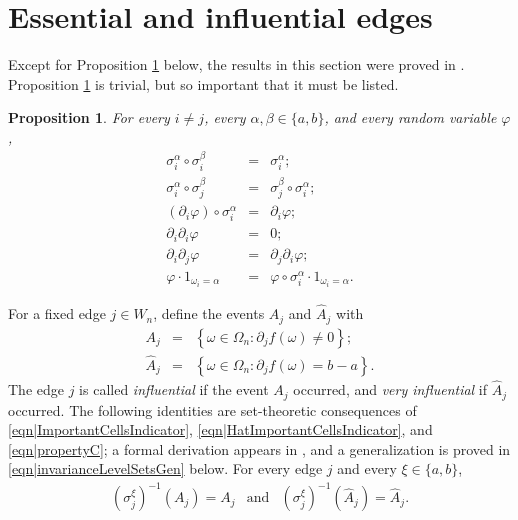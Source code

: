 \documentclass[reqno]{amsart}
\newtheorem{proposition}[theorem]{Proposition}
\begin{document}
\section{Essential and influential edges}
Except for Proposition \ref{thm|Straightforward} below, the results in this section were proved in \cite{FirstPaper2025}. Proposition \ref{thm|Straightforward} is trivial, 
but so important that it must be listed. 
\begin{proposition}\label{thm|Straightforward} For every $i\neq j$, every $\alpha,\beta\in\{a,b\}$, and every random variable $\varphi$, 
\begin{eqnarray} 
\sigma_i^{\alpha}\circ \sigma_i^{\beta}&=&\sigma_i^{\alpha};   \label{eqn|propertyA}\\
\sigma_i^{\alpha}\circ \sigma_j^{\beta}&=&\sigma_j^{\beta}\circ\sigma_i^{\alpha};  \label{eqn|propertyB} \\
(\partial_i \varphi)\circ \sigma_i^{\alpha} &=& \partial_i \varphi;  \label{eqn|propertyC} \\
\partial_i\partial_i \varphi&=&0;  \label{eqn|propertyD} \\
\partial_i\partial_j \varphi&=&\partial_j\partial_i\varphi;  \label{eqn|propertyE} \\
\varphi\cdot 1_{\omega_i=\alpha}&=&\varphi\circ \sigma_i^{\alpha}\cdot 1_{\omega_i=\alpha}.  \label{eqn|propertyF}
\end{eqnarray}
\end{proposition}

 





For a fixed edge $j\in W_n$, define the events $A_j$ and $\hat A_j$ with 
\begin{eqnarray}
A_j&=&\left\{\omega\in\Omega_n:\partial_jf(\omega)\neq 0\right\}; \label{eqn|ImportantCellsIndicator}\\
\hat A_j&=&\left\{\omega\in\Omega_n:\partial_j f(\omega)=b-a\right\}. \label{eqn|HatImportantCellsIndicator}
\end{eqnarray}
The edge $j$ is called {\em influential} if the event $A_j$ occurred, and {\em very influential} if $\hat A_j$ occurred.
The following identities are set-theoretic consequences of 
\eqref{eqn|ImportantCellsIndicator}, 
\eqref{eqn|HatImportantCellsIndicator}, and \eqref{eqn|propertyC}; 
a formal derivation appears in \cite{FirstPaper2025}, and a 
generalization is proved in \eqref{eqn|invarianceLevelSetsGen} below. 
For every edge $j$ and every $\xi\in\{a,b\}$,
\begin{eqnarray}
\left(\sigma_j^{\xi}\right)^{-1}(A_j)=A_j 
&\mbox{and}& 
\left(\sigma_j^{\xi}\right)^{-1}(\hat A_j)=\hat A_j. 
\label{eqn|invarianceLevelSets}
\end{eqnarray}
\end{document}
